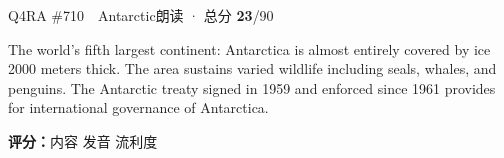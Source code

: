 \begin{qblock}{Q4\quad RA \#710\ \ Antarctic}{朗读 · 总分 \textcolor{cAccent}{\bfseries 23}/90}
\begin{promptbox}
The world's fifth largest continent: Antarctica is almost entirely covered by ice 2000 meters thick. The area sustains varied wildlife including seals, whales, and penguins. The Antarctic treaty signed in 1959 and enforced since 1961 provides for international governance of Antarctica.
\end{promptbox}
\asrlegend
\begin{asrbox}
     \pse {}              \pse {} \pse {}  \pse {}               \pse {}   
\end{asrbox}
\smallskip
{\small\textbf{评分：}内容  \quad\textperiodcentered\quad 发音  \quad\textperiodcentered\quad 流利度 }
\end{qblock}

